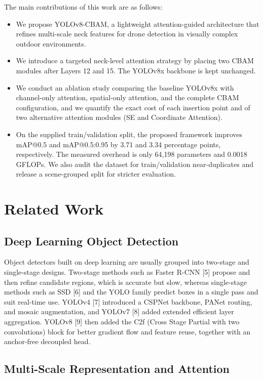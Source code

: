 \documentclass[conference]{IEEEtran}
\begin{document}
The main contributions of this work are as follows:
\begin{itemize}
\item We propose YOLOv8-CBAM, a lightweight attention-guided architecture that refines multi-scale neck features for drone detection in visually complex outdoor environments.
\item We introduce a targeted neck-level attention strategy by placing two CBAM modules after Layers 12 and 15. The YOLOv8x backbone is kept unchanged.
\item We conduct an ablation study comparing the baseline YOLOv8x with channel-only attention, spatial-only attention, and the complete CBAM configuration, and we quantify the exact cost of each insertion point and of two alternative attention modules (SE and Coordinate Attention).
\item On the supplied train/validation split, the proposed framework improves mAP@0.5 and mAP@0.5:0.95 by 3.71 and 3.34 percentage points, respectively. The measured overhead is only 64,198 parameters and 0.0018 GFLOPs. We also audit the dataset for train/validation near-duplicates and release a scene-grouped split for stricter evaluation.
\end{itemize}


\section{Related Work}

\subsection{Deep Learning Object Detection}

Object detectors built on deep learning are usually grouped into two-stage and single-stage designs. Two-stage methods such as Faster R-CNN [5] propose and then refine candidate regions, which is accurate but slow, whereas single-stage methods such as SSD [6] and the YOLO family predict boxes in a single pass and suit real-time use. YOLOv4 [7] introduced a CSPNet backbone, PANet routing, and mosaic augmentation, and YOLOv7 [8] added extended efficient layer aggregation. YOLOv8 [9] then added the C2f (Cross Stage Partial with two convolutions) block for better gradient flow and feature reuse, together with an anchor-free decoupled head.

\subsection{Multi-Scale Representation and Attention}
\end{document}
